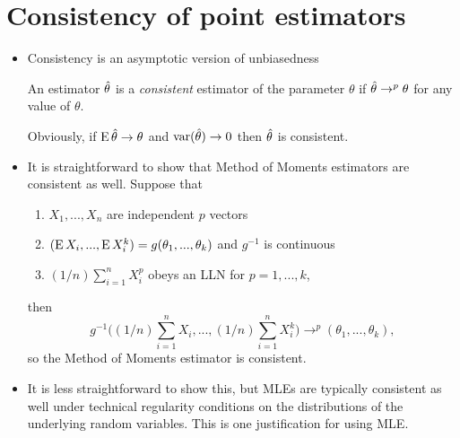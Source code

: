 \section{Consistency of point estimators}

\begin{itemize}[leftmargin=0pt]

\item Consistency is an asymptotic version of unbiasedness
  \begin{defn}
    An estimator $\hat{\theta}$ is a \emph{consistent} estimator of the
    parameter $\theta$ if $\hat{\theta} \to^p \theta$ for any value of $\theta$.
  \end{defn}

  Obviously, if $\operatorname{E} \hat{\theta} \to \theta$ and $\operatorname{var}(\hat{\theta}) \to 0$ then $\hat{\theta}$ is
  consistent.

\item It is straightforward to show that Method of Moments estimators
  are consistent as well.  Suppose that
  \begin{enumerate}
  \item $X_1,...,X_n$ are independent $p$ vectors
  \item $(\operatorname{E} X_i,...,\operatorname{E} X_i^k) = g(\theta_1,...,\theta_k)$ and $g^{-1}$ is
    continuous
  \item $(1/n) \sum_{i=1}^n X_i^p$ obeys an LLN for $p = 1,...,k$,
  \end{enumerate}
  then
  \begin{equation*}
    g^{-1}\Big( (1/n) \sum_{i=1}^n X_i,..., (1/n) \sum_{i=1}^n X_i^k \Big)
    \to^p (\theta_1,...,\theta_k),
  \end{equation*}
  so the Method of Moments estimator is consistent.

\item It is less straightforward to show this, but MLEs are typically
  consistent as well under technical regularity conditions on the
  distributions of the underlying random variables.  This is one
  justification for using MLE.

\end{itemize}


